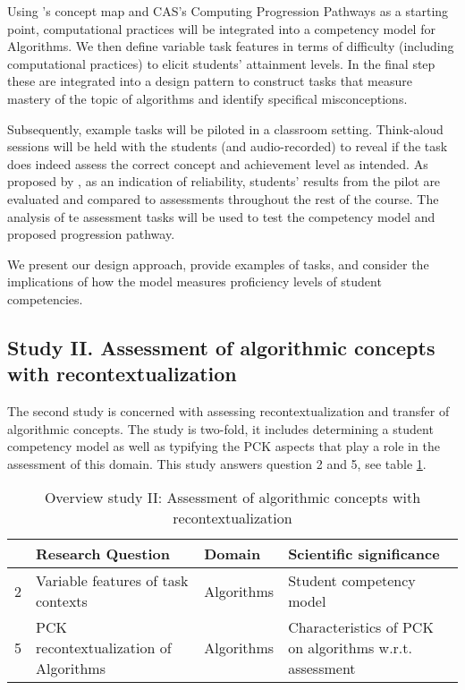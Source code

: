 Using \citeauthor{LuxtonReilly2018}'s concept map and CAS's Computing Progression Pathways \cite{CASProgressionPathways} as a starting point, computational practices will be integrated into a competency model for Algorithms. We then define variable task features in terms of difficulty (including computational practices) to elicit students' attainment levels. In the final step these are integrated into a design pattern to construct tasks that measure mastery of the topic of algorithms and identify specifical misconceptions.

Subsequently, example tasks will be piloted in a classroom setting. Think-aloud sessions will be held with the students (and audio-recorded) to reveal if the task does indeed assess the correct concept and achievement level as intended. As proposed by , as an indication of reliability, students' results from the pilot are evaluated and compared to assessments throughout the rest of the course. The analysis of te assessment tasks will be used to test the competency model and proposed progression pathway.

%


We present our design approach, provide examples of tasks, and consider the implications of how the model measures proficiency levels of student competencies.


\subsection{Study II. Assessment of algorithmic concepts with recontextualization} %

The second study is concerned with assessing recontextualization and transfer of algorithmic concepts. The study is two-fold, it includes determining a student competency model as well as typifying the PCK aspects that play a role in the assessment of this domain. This study answers question 2 and 5, see table \ref{table:StudyIIresearchQues}.
\begin{table}
  \centering
\begin{tabular}{|c|p{70mm}|l|p{50mm}|}
   \hline
    &\textbf{Research Question} & \textbf{Domain} & \textbf{Scientific significance}\\
  \hline

  2 & Variable features of task contexts& Algorithms & Student competency model \\ \hline
  5 & PCK recontextualization of Algorithms & Algorithms & Characteristics of PCK on algorithms w.r.t. assessment\\
  \hline
\end{tabular}
\caption{Overview study II: Assessment of algorithmic concepts with recontextualization}\label{table:StudyIIresearchQues}
\end{table}


